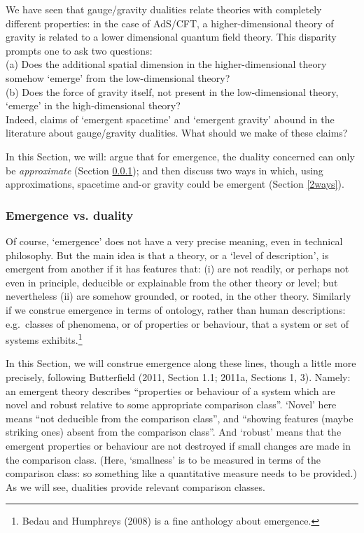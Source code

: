 \documentclass[12pt]{article}
\renewcommand{\^}[1]{\hat{#1}}
\begin{document}
We have seen that gauge/gravity dualities relate theories with completely different properties: in the case of AdS/CFT, a higher-dimensional theory of gravity is related to a lower dimensional quantum field theory. This disparity prompts one to ask two questions:\\
\indent (a) Does the additional spatial dimension in the higher-dimensional theory somehow `emerge' from the low-dimensional theory?\\
\indent (b) Does the force of gravity itself, not present in the low-dimensional theory, `emerge' in the high-dimensional theory? \\
Indeed, claims of `emergent spacetime' and `emergent gravity' abound in the literature about gauge/gravity dualities. What should we make of these claims? 

In this Section, we will: argue that for emergence, the duality concerned can only be {\em approximate} (Section \ref{emapprox}); and then discuss two ways in which, using approximations, spacetime and-or gravity could be emergent (Section \ref{2ways}).

\subsubsection{Emergence vs. duality}\label{emapprox} 

Of course, `emergence' does not have a very precise meaning, even in technical philosophy. But the main idea is that a theory, or a `level of description', is emergent from another if it has features that: (i) are not readily, or perhaps not even in principle, deducible or explainable from the other theory or level; but nevertheless (ii) are somehow grounded, or rooted, in the other theory.  Similarly if we construe emergence in terms of ontology, rather than human descriptions: e.g.~classes of phenomena, or of properties or behaviour, that a system or set of systems exhibits.\footnote{Bedau and Humphreys (2008) is a fine anthology about emergence.} 

In this Section, we will construe emergence along these lines, though a little more precisely, following Butterfield (2011, Section 1.1; 2011a, Sections 1, 3). Namely: an emergent theory describes ``properties or behaviour of a system which are novel and robust relative to some appropriate comparison class''. `Novel' here means ``not deducible from the comparison class'', and ``showing features (maybe striking ones) absent from the comparison class''. And `robust' means that the emergent properties or behaviour are not destroyed if small changes are made in the comparison class. (Here, `smallness' is to be measured in terms of the comparison class: so something like a quantitative measure needs to be provided.) As we will see, dualities provide relevant comparison classes. 
\end{document}
